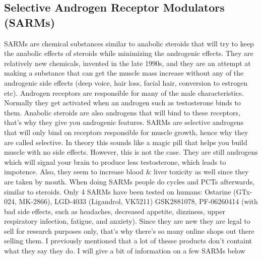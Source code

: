 \documentclass[openany, 12pt]{book}
\begin{document}
        \FloatBarrier
        
        \subsection{Selective Androgen Receptor Modulators (SARMs)}

        SARMs are chemical substances similar to anabolic steroids that will try to keep the anabolic effects of steroids while minimizing the androgenic effects.
        They are relatively new chemicals, invented in the late 1990s, and they are an attempt at making a substance that can get the muscle mass increase without
        any of the androgenic side effects (deep voice, hair loss, facial hair, conversion to estrogen etc).
        Androgen receptors are responsible for many of the male characteristics. Normally they get activated when an androgen such as testosterone
        binds to them. Anabolic steroids are also androgens that will bind to these receptors, that's why they give you androgenic features.
        SARMs are selective androgens that will only bind on receptors responsible for muscle growth, hence why they are called selective. In theory this sounds like a magic pill
        that helps you build muscle with no side effects. However, this is not the case. They are still androgens which will signal your brain to produce less testosterone, which
        leads to impotence. Also, they seem to increase blood \& liver toxicity as well since they are taken by mouth. When doing SARMs people do cycles and PCTs afterwards, similar to steroids.
        Only 4 SARMs have been tested on humans: Ostarine (GTx-024, MK-2866), LGD-4033 (Ligandrol, VK5211)
        GSK2881078, PF-06260414 (with bad side effects, such as headaches, decreased appetite, dizziness, upper respiratory infection, fatigue, and anxiety).
        Since they are new they are legal to sell for research purposes only, that's why there's so many online shops out there selling them. I previously mentioned that a lot of thesse
        products don't containt what they say they do. I will give a bit of information on a few SARMs below
\end{document}
